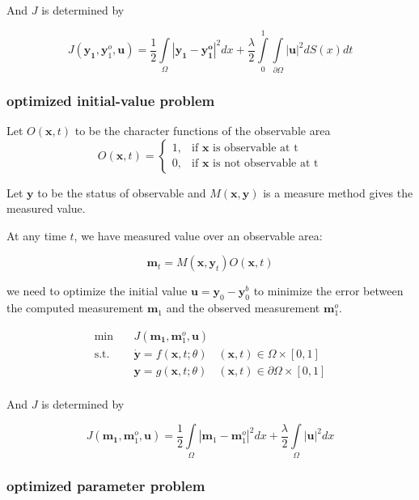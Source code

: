\documentclass{article}
\begin{document}
And $ J $ is determined by

$$
J(\mathbf{y_1}, \mathbf{y}_1^o, \mathbf{u}) = \frac{1}{2} \int\limits_{\Omega}|\mathbf{y_1} - \mathbf{y_1^o}|^2dx +  \frac{\lambda}{2} \int\limits_{0}^{1}\int\limits_{\partial \Omega} |\mathbf{u}|^2 dS(x) dt
$$

\subsubsection{optimized initial-value problem}

Let $ O(\mathbf{x}, t) $ to be the character functions of the observable area
$$
O(\mathbf{x}, t) = \begin{cases}
1, & \text{if }\mathbf{x}\text{ is observable at t} \\
0, & \text{if }\mathbf{x}\text{ is not observable at t}
\end{cases}
$$

Let $ \mathbf{y} $ to be the status of observable and $ M(\mathbf{x}, \mathbf{y}) $ is a measure method gives the measured value.

At any time $ t $, we have measured value over an observable area:

$$ \mathbf{m}_t = M(\mathbf{x}, \mathbf{y}_t) O(\mathbf{x}, t) $$

we need to optimize the initial value $ \mathbf{u} = \mathbf{y}_0 - \mathbf{y}_0^b $  to minimize the error between the computed measurement $ \mathbf{m}_1 $ and the observed measurement $ \mathbf{m}_1^o $.

$$
\begin{array}{rcll}
\min &~& J(\mathbf{m_1}, \mathbf{m}_1^o, \mathbf{u}) & \\
\mathrm{s.t.} &~& \dot{\mathbf{y}} = f(\mathbf{x}, t; \theta) & (\mathbf{x}, t) \in \Omega \times [0, 1] \\
&~& \mathbf{y} = g(\mathbf{x}, t; \theta) & (\mathbf{x}, t) \in \partial \Omega \times [0, 1] \\
\end{array}
$$

And $ J $ is determined by

$$
J(\mathbf{m_1}, \mathbf{m}_1^o, \mathbf{u}) = \frac{1}{2} \int\limits_{\Omega}|\mathbf{m}_1 - \mathbf{m}_1^o|^2 dx + \frac{\lambda}{2} \int\limits_{\Omega}|\mathbf{u}|^2 dx
$$

\subsubsection{optimized parameter problem}
\end{document}
